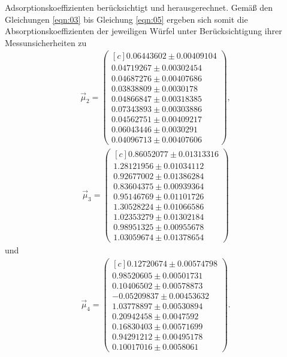 Adsorptionskoeffizienten berücksichtigt und herausgerechnet. Gemäß den
Gleichungen \ref{eqn:03} bis Gleichung \ref{eqn:05} ergeben sich somit die
Absorptionskoeffizienten der jeweiligen Würfel unter Berücksichtigung ihrer
Messunsicherheiten zu
\begin{align}
  \vec{\mu}_2 = \begin{pmatrix*}[c]
                0.06443602 \pm 0.00409104 \\
                0.04719267 \pm 0.00302454 \\
                0.04687276 \pm 0.00407686 \\
                0.03838809 \pm 0.0030178 \\
                0.04866847 \pm 0.00318385 \\
                0.07343893 \pm 0.00303886 \\
                0.04562751 \pm 0.00409217 \\
                0.06043446 \pm 0.0030291 \\
                0.04096713 \pm 0.00407606
                \end{pmatrix*},
\end{align}
\begin{align}
  \vec{\mu}_3 = \begin{pmatrix*}[c]
                0.86052077 \pm 0.01313316  \\
                1.28121956 \pm 0.01034112  \\
                0.92677002 \pm 0.01386284  \\
                0.83604375 \pm 0.00939364  \\
                0.95146769 \pm 0.01101726  \\
                1.30528224 \pm 0.01066586 \\
                1.02353279 \pm 0.01302184  \\
                0.98951325 \pm 0.00955678  \\
                1.03059674 \pm 0.01378654
                \end{pmatrix*}
\end{align}
\noindent und
\begin{align}
  \vec{\mu}_4 = \begin{pmatrix*}[c]
                 0.12720674   \pm 0.00574798  \\
                 0.98520605   \pm 0.00501731  \\
                 0.10406502   \pm 0.00578873  \\
                 -0.05209837  \pm  0.00453632 \\
                 1.03778897   \pm 0.00530894  \\
                 0.20942458   \pm 0.0047592   \\
                 0.16830403   \pm 0.00571699  \\
                 0.94291212   \pm 0.00495178  \\
                 0.10017016   \pm 0.0058061
                \end{pmatrix*}.
\end{align}
